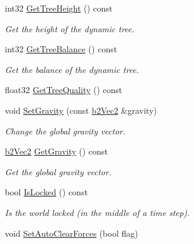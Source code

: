 \begin{DoxyCompactItemize}
int32 \hyperlink{classb2World_abc99b2beb6ba79ac6c80f33bac264b52}{Get\+Tree\+Height} () const
\begin{DoxyCompactList}\small\item\em Get the height of the dynamic tree. \end{DoxyCompactList}\item 
\mbox{\label{classb2World_aaca027331f06d93d978b44e065873f80}} 
int32 \hyperlink{classb2World_aaca027331f06d93d978b44e065873f80}{Get\+Tree\+Balance} () const
\begin{DoxyCompactList}\small\item\em Get the balance of the dynamic tree. \end{DoxyCompactList}\item 
float32 \hyperlink{classb2World_a562935b3b8161dd18a467e02f479e88a}{Get\+Tree\+Quality} () const
\item 
\mbox{\label{classb2World_aeafa43d6580e1dddb0675e672ca2375c}} 
void \hyperlink{classb2World_aeafa43d6580e1dddb0675e672ca2375c}{Set\+Gravity} (const \hyperlink{structb2Vec2}{b2\+Vec2} \&gravity)
\begin{DoxyCompactList}\small\item\em Change the global gravity vector. \end{DoxyCompactList}\item 
\mbox{\label{classb2World_abd41cdde8eaa3d1c58d2f00eaf688ec3}} 
\hyperlink{structb2Vec2}{b2\+Vec2} \hyperlink{classb2World_abd41cdde8eaa3d1c58d2f00eaf688ec3}{Get\+Gravity} () const
\begin{DoxyCompactList}\small\item\em Get the global gravity vector. \end{DoxyCompactList}\item 
\mbox{\label{classb2World_a71ca09a3082945a7e77f3f39fb021237}} 
bool \hyperlink{classb2World_a71ca09a3082945a7e77f3f39fb021237}{Is\+Locked} () const
\begin{DoxyCompactList}\small\item\em Is the world locked (in the middle of a time step). \end{DoxyCompactList}\item 
\mbox{\label{classb2World_aa2bced28ddef5bbb00ed5666e5e9f620}} 
void \hyperlink{classb2World_aa2bced28ddef5bbb00ed5666e5e9f620}{Set\+Auto\+Clear\+Forces} (bool flag)

\end{DoxyCompactItemize}
